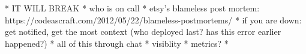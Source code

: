 
* IT WILL BREAK
* who is on call
* etsy's blameless post mortem: https://codeascraft.com/2012/05/22/blameless-postmortems/
* if you are down: get notified, get the most context (who deployed last? has this error earlier happened?)
* all of this through chat
* visiblity
* metrics?
* 
